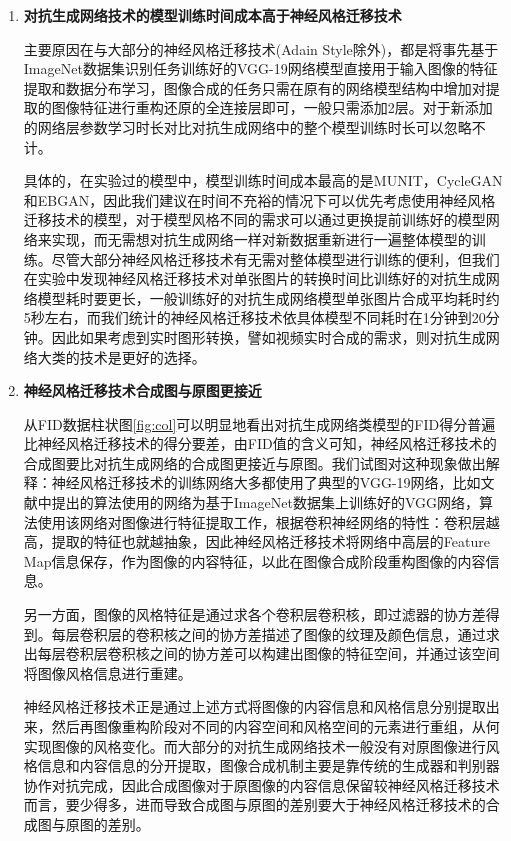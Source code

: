 \begin{enumerate}[itemindent=20pt, listparindent = 0.7cm]
    \item \textbf{对抗生成网络技术的模型训练时间成本高于神经风格迁移技术}
    
    主要原因在与大部分的神经风格迁移技术(Adain Style除外)，都是将事先基于ImageNet数据集识别任务训练好的VGG-19网络模型直接用于输入图像的特征提取和数据分布学习，图像合成的任务只需在原有的网络模型结构中增加对提取的图像特征进行重构还原的全连接层即可，一般只需添加2层。对于新添加的网络层参数学习时长对比对抗生成网络中的整个模型训练时长可以忽略不计。
    
    具体的，在实验过的模型中，模型训练时间成本最高的是MUNIT，CycleGAN和EBGAN，因此我们建议在时间不充裕的情况下可以优先考虑使用神经风格迁移技术的模型，对于模型风格不同的需求可以通过更换提前训练好的模型网络来实现，而无需想对抗生成网络一样对新数据重新进行一遍整体模型的训练。尽管大部分神经风格迁移技术有无需对整体模型进行训练的便利，但我们在实验中发现神经风格迁移技术对单张图片的转换时间比训练好的对抗生成网络模型耗时要更长，一般训练好的对抗生成网络模型单张图片合成平均耗时约5秒左右，而我们统计的神经风格迁移技术依具体模型不同耗时在1分钟到20分钟。因此如果考虑到实时图形转换，譬如视频实时合成的需求，则对抗生成网络大类的技术是更好的选择。

    \item \textbf{神经风格迁移技术合成图与原图更接近}
    
    从FID数据柱状图\ref{fig:col}可以明显地看出对抗生成网络类模型的FID得分普遍比神经风格迁移技术的得分要差，由FID值的含义可知，神经风格迁移技术的合成图要比对抗生成网络的合成图更接近与原图。我们试图对这种现象做出解释：神经风格迁移技术的训练网络大多都使用了典型的VGG-19网络，比如文献\cite{nst}中提出的算法使用的网络为基于ImageNet数据集\cite{ImageNet}上训练好的VGG网络，算法使用该网络对图像进行特征提取工作，根据卷积神经网络的特性：卷积层越高，提取的特征也就越抽象，因此神经风格迁移技术将网络中高层的Feature Map信息保存，作为图像的内容特征，以此在图像合成阶段重构图像的内容信息。 

    另一方面，图像的风格特征是通过求各个卷积层卷积核，即过滤器的协方差得到。每层卷积层的卷积核之间的协方差描述了图像的纹理及颜色信息，通过求出每层卷积层卷积核之间的协方差可以构建出图像的特征空间，并通过该空间将图像风格信息进行重建。

    神经风格迁移技术正是通过上述方式将图像的内容信息和风格信息分别提取出来，然后再图像重构阶段对不同的内容空间和风格空间的元素进行重组，从何实现图像的风格变化。而大部分的对抗生成网络技术一般没有对原图像进行风格信息和内容信息的分开提取，图像合成机制主要是靠传统的生成器和判别器协作对抗完成，因此合成图像对于原图像的内容信息保留较神经风格迁移技术而言，要少得多，进而导致合成图与原图的差别要大于神经风格迁移技术的合成图与原图的差别。


\end{enumerate}
